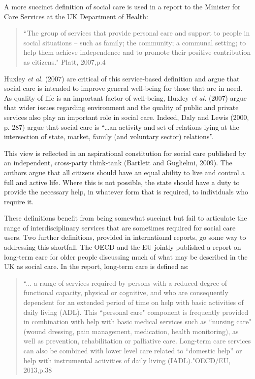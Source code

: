 \documentclass[12pt,a4paper,oneside,table]{report}
\begin{document}
A more succinct definition of social care is used in a report to the
Minister for Care Services at the UK Department of Health:

\begin{quotation}
    ``The group of services that provide personal care and support to people in social situations – such as family; the community; a communal setting; to help them achieve independence and to promote their positive contribution as citizens." \hfill{Platt, 2007,p.4}\end{quotation}

Huxley \textit{et al.} (2007) are critical of this service-based
definition and argue that social care is intended to improve general
well-being for those that are in need. As quality of life is an
important factor of well-being, Huxley \textit{et al.} (2007) argue that
wider issues regarding environment and the quality of public and private
services also play an important role in social care. Indeed, Daly and
Lewis (2000, p. 287) argue that social care is ``\ldots{}an activity and
set of relations lying at the intersection of state, market, family (and
voluntary sector) relations''.

This view is reflected in an aspirational constitution for social care
published by an independent, cross-party think-tank (Bartlett and
Guglielmi, 2009). The authors argue that all citizens should have an
equal ability to live and control a full and active life. Where this is
not possible, the state should have a duty to provide the necessary
help, in whatever form that is required, to individuals who require it.

These definitions benefit from being somewhat succinct but fail to
articulate the range of interdisciplinary services that are sometimes
required for social care users. Two further definitions, provided in
international reports, go some way to addressing this shortfall. The
OECD and the EU jointly published a report on long-term care for older
people discussing much of what may be described in the UK as social
care. In the report, long-term care is defined as:

\begin{quotation}
``... a range of services required by persons with a reduced degree of functional capacity, physical or cognitive, and who are consequently dependent for an extended period of time on help with basic activities of daily living (ADL). This ``personal care" component is frequently provided in combination with help with basic medical services such as ``nursing care" (wound dressing, pain management, medication, health monitoring), as well as prevention, rehabilitation or palliative care. Long-term care services can also be combined with lower level care related to ``domestic help” or help with instrumental activities of daily living (IADL)."\hfill{OECD/EU, 2013,p.38}\end{quotation}
\end{document}
